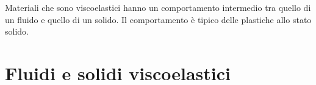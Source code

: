 Materiali che sono viscoelastici hanno un comportamento intermedio tra quello di un fluido e quello di un solido. Il comportamento è tipico delle plastiche allo stato solido.

\section{Fluidi e solidi viscoelastici}